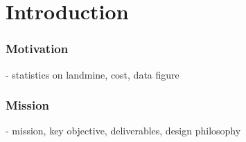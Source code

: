 \section{Introduction} \label{introduction}

\subsubsection{Motivation}

- statistics on landmine, cost, data figure

\subsubsection{Mission}

- mission, key objective, deliverables, design philosophy 

